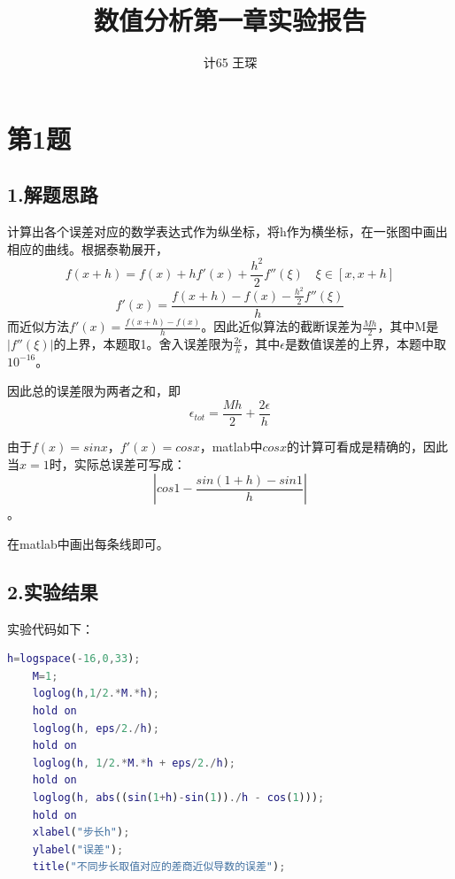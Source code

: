 \documentclass[12pt, utf8, hyperref]{article}
\title{数值分析第一章实验报告}
\author{计65 \quad 王琛 \quad 2016011360}
\begin{document}
\maketitle

\section*{第1题}
\subsection*{1.解题思路}
计算出各个误差对应的数学表达式作为纵坐标，将h作为横坐标，在一张图中画出相应的曲线。根据泰勒展开，
\[
    f(x+h) = f(x)+hf'(x)+\frac{{h}^{2}}{2}f''(\xi) \quad \xi \in [x, x+h]
\]
\[
    f'(x) = 
    \frac{f(x+h)-f(x)-\frac{{h}^{2}}{2}f''(\xi)}{h}
\]
而近似方法$f'(x)=\frac{f(x+h)-f(x)}{h}$。因此近似算法的截断误差为$\frac{Mh}{2}$，其中M是$|f''(\xi)|$的上界，本题取1。舍入误差限为$\frac{2\epsilon}{h}$，其中$\epsilon$是数值误差的上界，本题中取$10^{-16}$。

因此总的误差限为两者之和，即
\begin{equation}
    \epsilon_{tot}=\frac{Mh}{2} + \frac{2\epsilon}{h}
\end{equation}

由于$f(x)=sinx$，$f'(x)=cosx$，matlab中$cosx$的计算可看成是精确的，因此当$x=1$时，实际总误差可写成：
\[ |cos1 - \frac{sin(1+h)-sin1}{h}|\]。

在matlab中画出每条线即可。

\subsection*{2.实验结果}
实验代码如下：
\begin{lstlisting}[language=matlab]
    h=logspace(-16,0,33);
    M=1;
    loglog(h,1/2.*M.*h);
    hold on
    loglog(h, eps/2./h);
    hold on
    loglog(h, 1/2.*M.*h + eps/2./h);
    hold on
    loglog(h, abs((sin(1+h)-sin(1))./h - cos(1)));
    hold on
    xlabel("步长h");
    ylabel("误差");
    title("不同步长取值对应的差商近似导数的误差");
\end{lstlisting}
\end{document}
